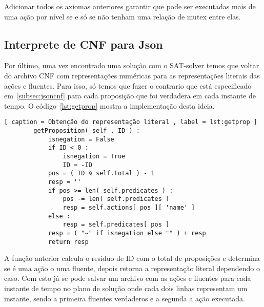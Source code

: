 	Adicionar todos os axiomas anteriores garantir que pode ser executadas mais de uma ação por nível se e só se não tenham uma relação de mutex entre elas.
	
\subsection{Interprete de CNF para Json}
\label{subsec:cnfjson}
	Por último, uma vez encontrado uma solução com o SAT-solver temos que voltar do archivo CNF com representações numéricas para as representações literais das ações e fluentes. Para isso, só temos que fazer o contrario que está especificado em~\ref{subsec:jsoncnf} para cada proposição que foi verdadera em cada instante de tempo. O código~\ref{lst:getprop} mostra a implementação desta ideia.
	\begin{lstlisting}[ caption = Obtenção do representação literal , label = lst:getprop ]
		getProposition( self , ID ) :
			isnegation = False
			if ID < 0 :
				isnegation = True
				ID = -ID
			pos = ( ID % self.total ) - 1
			resp = ''
			if pos >= len( self.predicates ) :
				pos -= len( self.predicates )
				resp = self.actions[ pos ][ 'name' ]
			else :
				resp = self.predicates[ pos ]
			resp = ( "~" if isnegation else "" ) + resp
			return resp
	\end{lstlisting}
	A função anterior calcula o resíduo de ID com o total de proposições e determina se é uma ação o uma fluente, depois retorna a representação literal dependendo o caso.
	Com esto já se pode salvar um archivo com as ações e fluentes para cada instante de tempo no plano de solução onde cada dois linhas representam um instante, sendo a primeira fluentes verdaderos e a segunda a ação executada.